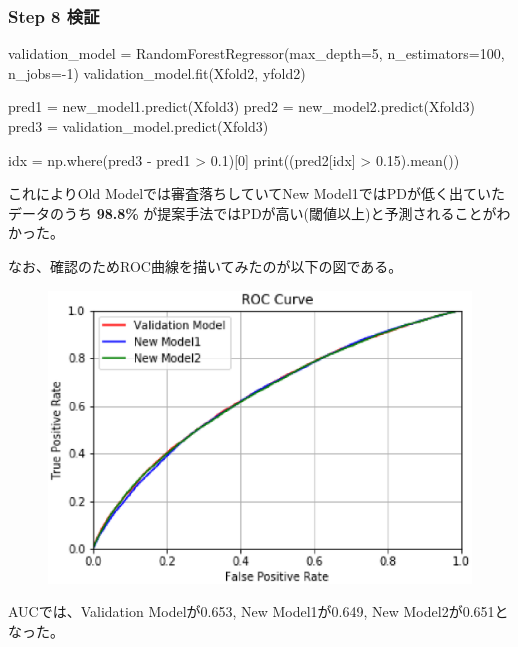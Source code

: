 \documentclass[11pt]{jsarticle}
\newenvironment{Shaded}{}{}
\newcommand{\DecValTok}[1]{\textcolor[rgb]{0.25,0.63,0.44}{{#1}}}
\newcommand{\FloatTok}[1]{\textcolor[rgb]{0.25,0.63,0.44}{{#1}}}
\newcommand{\NormalTok}[1]{{#1}}
\newcommand{\OperatorTok}[1]{\textcolor[rgb]{0.40,0.40,0.40}{{#1}}}
\newcommand{\BuiltInTok}[1]{{#1}}
\begin{document}
    \subsubsection{Step 8 検証}\label{step-8-ux691cux8a3c}

    \begin{Shaded}
\begin{Highlighting}[]
\NormalTok{validation_model }\OperatorTok{=}\NormalTok{ RandomForestRegressor(max_depth}\OperatorTok{=}\DecValTok{5}\NormalTok{, n_estimators}\OperatorTok{=}\DecValTok{100}\NormalTok{, n_jobs}\OperatorTok{=-}\DecValTok{1}\NormalTok{)}
\NormalTok{validation_model.fit(Xfold2, yfold2)}

\NormalTok{pred1 }\OperatorTok{=}\NormalTok{ new_model1.predict(Xfold3)}
\NormalTok{pred2 }\OperatorTok{=}\NormalTok{ new_model2.predict(Xfold3)}
\NormalTok{pred3 }\OperatorTok{=}\NormalTok{ validation_model.predict(Xfold3)}

\NormalTok{idx }\OperatorTok{=}\NormalTok{ np.where(pred3 }\OperatorTok{-}\NormalTok{ pred1 }\OperatorTok{>} \FloatTok{0.1}\NormalTok{)[}\DecValTok{0}\NormalTok{]}
\BuiltInTok{print}\NormalTok{((pred2[idx] }\OperatorTok{>} \FloatTok{0.15}\NormalTok{).mean())}
\end{Highlighting}
\end{Shaded}

    これによりOld Modelでは審査落ちしていてNew
Model1ではPDが低く出ていたデータのうち \textbf{98.8\%}
が提案手法ではPDが高い(閾値以上)と予測されることがわかった。

    なお、確認のためROC曲線を描いてみたのが以下の図\label{fig:roc}である。
\begin{figure}[htbp]
  \begin{center}
    \includegraphics[clip, scale=0.80]{./ROC_CURVE.eps}
    \label{fig:roc}
  \end{center}
\end{figure}
    AUCでは、Validation Modelが0.653, New Model1が0.649, New
Model2が0.651となった。
\end{document}
